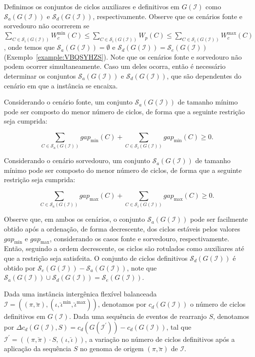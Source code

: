 Definimos os conjuntos de ciclos auxiliares e definitivos em $G(\mathcal{I})$ como $\mathcal{S}_a(G(\mathcal{I}))$ e $\mathcal{S}_d(G(\mathcal{I}))$, respectivamente. Observe que os cenários fonte e sorvedouro não ocorrerem se $\sum_{C \in \mathcal{S}_i(G(\mathcal{I}))} W^{\min}_c(C) \le \sum_{C \in \mathcal{S}_i(G(\mathcal{I}))} W_p(C) \le \sum_{C \in \mathcal{S}_i(G(\mathcal{I}))} W^{\max}_c(C)$, onde temos que $\mathcal{S}_a(G(\mathcal{I})) = \emptyset$ e $\mathcal{S}_d(G(\mathcal{I})) = \mathcal{S}_e(G(\mathcal{I}))$ (Exemplo~\ref{example:VBQSYHZS}). Note que os cenários fonte e sorvedouro não podem ocorrer simultaneamente. Caso um deles ocorra, então é necessário determinar os conjuntos $\mathcal{S}_a(G(\mathcal{I}))$ e $\mathcal{S}_d(G(\mathcal{I}))$, que são dependentes do cenário em que a instância se encaixa. 


Considerando o cenário fonte, um conjunto $\mathcal{S}_a(G(\mathcal{I}))$ de tamanho mínimo pode ser composto do menor número de ciclos, de forma que a seguinte restrição seja cumprida: 

$$\sum_{C \in \mathcal{S}_a(G(\mathcal{I}))} gap_{\min}(C) + \sum_{C \in \mathcal{S}_i(G(\mathcal{I}))} gap_{\min}(C) \ge 0.$$

Considerando o cenário sorvedouro, um conjunto $\mathcal{S}_a(G(\mathcal{I}))$ de tamanho mínimo pode ser composto do menor número de ciclos, de forma  que a seguinte restrição seja cumprida: 

$$\sum_{C \in \mathcal{S}_a(G(\mathcal{I}))} gap_{\max}(C) + \sum_{C \in \mathcal{S}_i(G(\mathcal{I}))} gap_{\max}(C) \ge 0.$$

Observe que, em ambos os cenários, o conjunto $\mathcal{S}_a(G(\mathcal{I}))$ pode ser facilmente obtido após a ordenação, de forma decrescente, dos ciclos estáveis pelos valores $gap_{\min}$ e $gap_{\max}$, considerando os casos fonte e sorvedouro, respectivamente. Então, seguindo a ordem decrescente, os ciclos são rotulados como auxiliares até que a restrição seja satisfeita. O conjunto de ciclos definitivos $\mathcal{S}_d(G(\mathcal{I}))$ é obtido por $\mathcal{S}_e(G(\mathcal{I})) - \mathcal{S}_a(G(\mathcal{I}))$, note que $\mathcal{S}_a(G(\mathcal{I})) \cup \mathcal{S}_d(G(\mathcal{I})) = \mathcal{S}_e(G(\mathcal{I}))$.

Dada uma instância intergênica flexível balanceada $\mathcal{I} = ((\pi,\breve\pi),(\iota,\breve\iota^{\min},\breve\iota^{\max}))$, denotamos por $c_d(G(\mathcal{I}))$ o número de ciclos definitivos em $G(\mathcal{I})$. Dada uma sequência de eventos de rearranjo $S$, denotamos por $\Delta c_d(G(\mathcal{I}), S) = c_d(G(\mathcal{I^{\prime}})) - c_d(G(\mathcal{I}))$, tal que $\mathcal{I^{\prime}} = ((\pi,\breve\pi) \cdot S,(\iota,\breve\iota))$, a variação no número de ciclos definitivos após a aplicação da sequência $S$ no genoma de origem $(\pi,\breve\pi)$ de $\mathcal{I}$.


